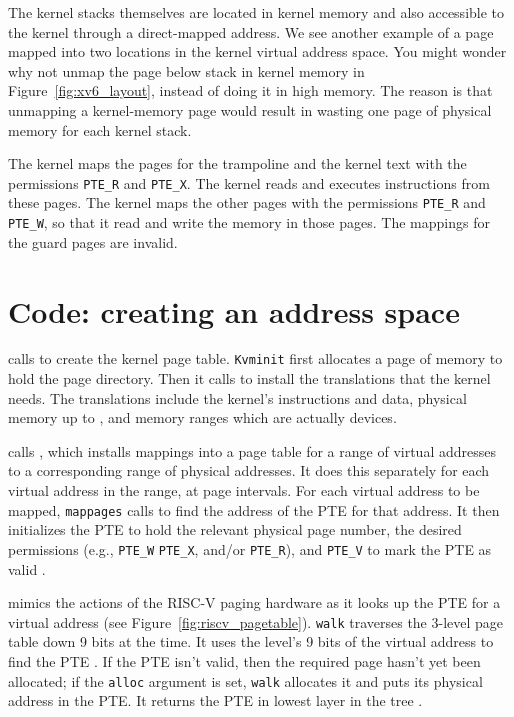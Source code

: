 The kernel stacks themselves are located in kernel memory and also
accessible to the kernel through a direct-mapped address.  We see
another example of a page mapped into two locations in the kernel
virtual address space.  You might wonder why not unmap the page below
stack in kernel memory in Figure~\ref{fig:xv6_layout}, instead of
doing it in high memory. The reason is that unmapping a kernel-memory
page would result in wasting one page of physical memory for each
kernel stack.

The kernel maps the pages for the trampoline and the kernel text with
the permissions
\lstinline{PTE_R}
and
\lstinline{PTE_X}.
The kernel reads and executes instructions from these pages.
The kernel maps the other pages with the permissions
\lstinline{PTE_R}
and
\lstinline{PTE_W},
so that it read and write the memory in those pages.
The mappings for the guard pages are invalid.


\section{Code: creating an address space}

calls
to create the kernel page table.
\lstinline{Kvminit}
first allocates a page of memory to hold the page directory.
Then it calls
to install the translations that the kernel needs.
The translations include the kernel's
instructions and data, physical memory up to
,
and memory ranges which are actually devices.

calls
,
which
installs mappings into a page table
for a range of virtual addresses to
a corresponding range of physical addresses.
It does this separately for each virtual address in the range,
at page intervals.
For each virtual address to be mapped,
\lstinline{mappages}
calls
to find the address of the PTE for that address.
It then initializes the PTE to hold the relevant physical page
number, the desired permissions (e.g.,
\lstinline{PTE_W}
\lstinline{PTE_X},
and/or
\lstinline{PTE_R}),
and
\lstinline{PTE_V}
to mark the PTE as valid
.

mimics the actions of the RISC-V paging hardware as it
looks up the PTE for a virtual address (see
Figure~\ref{fig:riscv_pagetable}).
\lstinline{walk}
traverses the 3-level page table down 9 bits at the time.
It uses the level's 9 bits of the virtual address to find
the PTE
.
If the PTE isn't valid, then
the required page hasn't yet been allocated;
if the
\lstinline{alloc}
argument is set,
\lstinline{walk}
allocates it and puts its physical address in the PTE.
It returns the PTE in lowest layer in the tree
.

